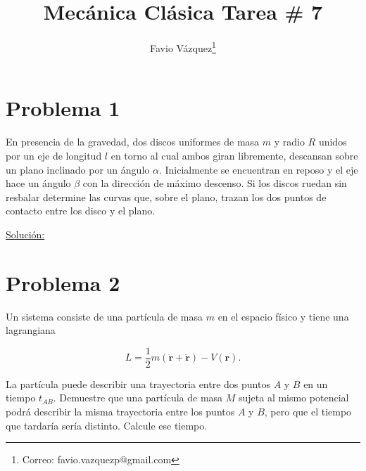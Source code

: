 \documentclass[a4paper,10pt]{article}
\title{Mecánica Clásica Tarea \# 7}
\author{Favio Vázquez\thanks{Correo: favio.vazquezp@gmail.com}}\affil{Instituto de Ciencias Nucleares. Universidad Nacional Autónoma de México.}
\date{}
\numberwithin{equation}{section}
\begin{document}
\makeatletter
\def\@maketitle{%
  \newpage
  \null
  \vskip 2em%
  \begin{center}%
  \let \footnote \thanks
    {\Large\bfseries \@title \par}%
    \vskip 1.5em%
    {\normalsize
      \lineskip .5em%
      \begin{tabular}[t]{c}%
        \@author
      \end{tabular}\par}%
    \vskip 1em%
    {\normalsize \@date}%
  \end{center}%
  \par
  \vskip 1.5em}
\makeatother

\maketitle

\section{Problema 1}

En presencia de la gravedad, dos discos uniformes de masa $m$ y radio $R$ unidos por 
un eje de longitud $l$ en torno al cual ambos giran libremente, descansan sobre un plano 
inclinado por un ángulo $\alpha$. Inicialmente se encuentran en reposo y el eje hace un ángulo 
$\beta$ con la dirección de máximo descenso. Si los discos ruedan sin resbalar determine 
las curvas que, sobre el plano, trazan los dos puntos de contacto entre los disco y el plano.

\vspace{.3cm}

\underline{Solución:} \vspace{.3cm}

\section{Problema 2}

Un sistema consiste de una partícula de masa $m$ en el espacio físico y tiene una 
lagrangiana

$$
L = \frac{1}{2}m(\mathbf{\dot{r}} + \mathbf{\dot{r}}) - V(\mathbf{r}).
$$

La partícula puede describir una trayectoria entre dos puntos $A$ y $B$ en un tiempo 
$t_{AB}$. Demuestre que una partícula de masa $M$ sujeta al mismo potencial podrá 
describir la misma trayectoria entre los puntos $A$ y $B$, pero que el tiempo que 
tardaría sería distinto. Calcule ese tiempo.
\end{document}
